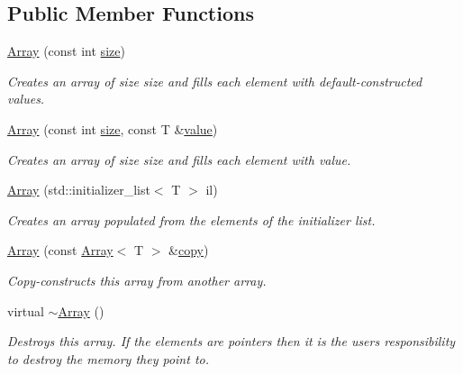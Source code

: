 \subsection*{Public Member Functions}
\begin{DoxyCompactItemize}
\item 
\hyperlink{classprism_1_1_array_aab128f1ed5a4547a04812b921dc75897}{Array} (const int \hyperlink{classprism_1_1_array_a83c88f0f351ac35798f40ed4e922e187}{size})
\begin{DoxyCompactList}\small\item\em Creates an array of size {\itshape size} and fills each element with default-\/constructed values. \end{DoxyCompactList}\item 
\hyperlink{classprism_1_1_array_ac696e19a99b7a601f013352617689098}{Array} (const int \hyperlink{classprism_1_1_array_a83c88f0f351ac35798f40ed4e922e187}{size}, const T \&\hyperlink{classprism_1_1_array_a2c5690996975510eed7112066b936d8f}{value})
\begin{DoxyCompactList}\small\item\em Creates an array of size {\itshape size} and fills each element with {\itshape value}. \end{DoxyCompactList}\item 
\hyperlink{classprism_1_1_array_ada5fda23d2713ee3b2875495c77948b2}{Array} (std\+::initializer\+\_\+list$<$ T $>$ il)
\begin{DoxyCompactList}\small\item\em Creates an array populated from the elements of the initializer list. \end{DoxyCompactList}\item 
\hyperlink{classprism_1_1_array_a15f0a0b32b4d95975fd15f0c1321d144}{Array} (const \hyperlink{classprism_1_1_array}{Array}$<$ T $>$ \&\hyperlink{namespaceprism_ae776f4cd825f79e7af1cf6ee1d90a209}{copy})
\begin{DoxyCompactList}\small\item\em Copy-\/constructs this array from another array. \end{DoxyCompactList}\item 
virtual \hyperlink{classprism_1_1_array_a359ddd91014d3a49b903cbb0ea207418}{$\sim$\+Array} ()
\begin{DoxyCompactList}\small\item\em Destroys this array. If the elements are pointers then it is the user\textquotesingle{}s responsibility to destroy the memory they point to. \end{DoxyCompactList}\item 

\end{DoxyCompactItemize}
